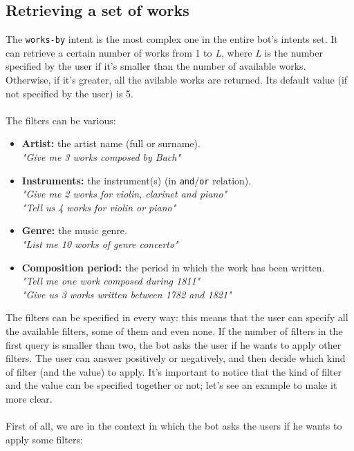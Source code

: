 	\subsection{Retrieving a set of works}
	The \texttt{works-by} intent is the most complex one in the entire bot's intents set. It can retrieve a certain number of works from 1 to \textit{L}, where \textit{L} is the number specified by the user if it's smaller than the number of available works. Otherwise, if it's greater, all the avilable works are returned. Its default value (if not specified by the user) is 5.\\\\
	The filters can be various:
	\begin{itemize}
		\item \textbf{Artist:}
		the artist name (full or surname).\\
		\textit{"Give me 3 works composed by Bach"}
		
		\item \textbf{Instruments:}
		the instrument(s) (in \texttt{and}/\texttt{or} relation).\\
		\textit{"Give me 2 works for violin, clarinet and piano"}\\
		\textit{"Tell us 4 works for violin or piano"}
		
		\item \textbf{Genre:}
		the music genre.\\
		\textit{"List me 10 works of genre concerto"}
		
		\item \textbf{Composition period:}
		the period in which the work has been written.\\
		\textit{"Tell me one work composed during 1811"}\\
		\textit{"Give us 3 works written between 1782 and 1821"}
		
	\end{itemize}
	The filters can be specified in every way: this means that the user can specify all the available filters, some of them and even none. If the number of filters in the first query is smaller than two, the bot asks the user if he wants to apply other filters. The user can answer positively or negatively, and then decide which kind of filter (and the value) to apply. It's important to notice that the kind of filter and the value can be specified together or not; let's see an example to make it more clear.\\\\
	First of all, we are in the context in which the bot asks the users if he wants to apply some filters:
	
